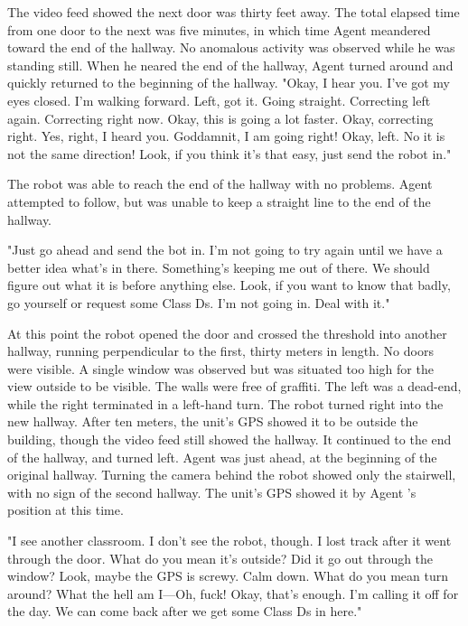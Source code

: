 The video feed showed the next door was thirty feet away. The total elapsed time from one door to the next was five minutes, in which time Agent  meandered toward the end of the hallway. No anomalous activity was observed while he was standing still. When he neared the end of the hallway, Agent  turned around and quickly returned to the beginning of the hallway.
\newpage
"Okay, I hear you. I've got my eyes closed. I'm walking forward. Left, got it. Going straight. Correcting left again. Correcting right now. Okay, this is going a lot faster. Okay, correcting right. Yes, right, I heard you. Goddamnit, I am going right! Okay, left. No it is not the same direction! Look, if you think it's that easy, just send the robot in."

The robot was able to reach the end of the hallway with no problems. Agent  attempted to follow, but was unable to keep a straight line to the end of the hallway.

"Just go ahead and send the bot in. I'm not going to try again until we have a better idea what's in there. Something's keeping me out of there. We should figure out what it is before anything else. Look, if you want to know that badly, go yourself or request some Class Ds. I'm not going in. Deal with it."

At this point the robot opened the door and crossed the threshold into another hallway, running perpendicular to the first, thirty meters in length. No doors were visible. A single window was observed but was situated too high for the view outside to be visible. The walls were free of graffiti. The left was a dead-end, while the right terminated in a left-hand turn. The robot turned right into the new hallway. After ten meters, the unit's GPS showed it to be outside the building, though the video feed still showed the hallway. It continued to the end of the hallway, and turned left. Agent  was just ahead, at the beginning of the original hallway. Turning the camera behind the robot showed only the stairwell, with no sign of the second hallway. The unit's GPS showed it by Agent 's position at this time.

"I see another classroom. I don't see the robot, though. I lost track after it went through the door. What do you mean it's outside? Did it go out through the window? Look, maybe the GPS is screwy. Calm down. What do you mean turn around? What the hell am I—Oh, fuck! Okay, that's enough. I'm calling it off for the day. We can come back after we get some Class Ds in here."